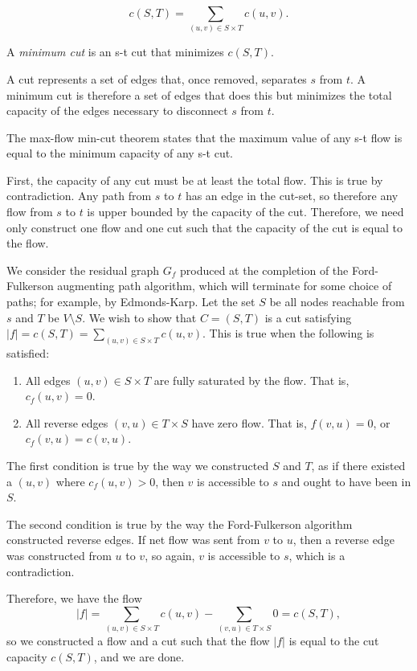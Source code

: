 \documentclass[11pt]{book}
\begin{document}
\[c(S,T) = \sum_{(u,v) \in S \times T}c(u,v).\]

A \textit{minimum cut} is an s-t cut that minimizes $c(S,T)$.

A cut represents a set of edges that, once removed, separates $s$ from $t$. A minimum cut is therefore a set of edges that does this but minimizes the total capacity of the edges necessary to disconnect $s$ from $t$.

The max-flow min-cut theorem states that the maximum value of any s-t flow is equal to the minimum capacity of any s-t cut.

First, the capacity of any cut must be at least the total flow. This is true by contradiction. Any path from $s$ to $t$ has an edge in the cut-set, so therefore any flow from $s$ to $t$ is upper bounded by the capacity of the cut. Therefore, we need only construct one flow and one cut such that the capacity of the cut is equal to the flow.

We consider the residual graph $G_f$ produced at the completion of the Ford-Fulkerson augmenting path algorithm, which will terminate for some choice of paths; for example, by Edmonds-Karp. Let the set $S$ be all nodes reachable from $s$ and $T$ be $V \setminus S$. We wish to show that $C=(S,T)$ is a cut satisfying $|f|=c(S,T)=\sum_{(u,v) \in S \times T} c(u,v)$. This is true when the following is satisfied:

\begin{enumerate}

\item
All edges $(u,v) \in S \times T$ are fully saturated by the flow. That is, $c_f(u,v) = 0$.

\item
All reverse edges $(v, u) \in T \times S$ have zero flow. That is, $f(v,u) = 0$, or $c_f(v,u) = c(v,u)$.

\end{enumerate}

The first condition is true by the way we constructed $S$ and $T$, as if there existed a $(u,v)$ where $c_f(u,v) > 0$, then $v$ is accessible to $s$ and ought to have been in $S$.

The second condition is true by the way the Ford-Fulkerson algorithm constructed reverse edges. If net flow was sent from $v$ to $u$, then a reverse edge was constructed from $u$ to $v$, so again, $v$ is accessible to $s$, which is a contradiction.

Therefore, we have the flow
\[|f|=\sum_{(u,v) \in S \times T} c(u,v) - \sum_{(v,u) \in T \times S} 0 = c(S,T),\]
so we constructed a flow and a cut such that the flow $|f|$ is equal to the cut capacity $c(S,T)$, and we are done.
\end{document}

